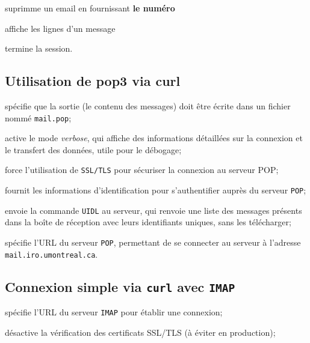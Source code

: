 \documentclass[a4paper]{report}
\begin{document}
     suprimme un email en fournissant 
    \textbf{le numéro}                                                      

     affiche les lignes d'un message

     termine la session.


\subsection{Utilisation de pop3 via curl}
    spécifie que la sortie (le contenu des messages) doit être écrite 
    dans un fichier nommé \texttt{mail.pop};  

    active le mode \textit{verbose}, qui affiche des informations détaillées 
    sur la connexion et le transfert des données, utile pour le débogage;  

    force l'utilisation de \texttt{SSL/TLS} pour sécuriser la connexion au 
    serveur POP;  

    fournit les informations d'identification  
    pour s'authentifier auprès du serveur \texttt{POP};  

    envoie la commande \texttt{UIDL} au serveur, 
    qui renvoie une liste des messages présents dans la boîte de réception 
    avec leurs identifiants uniques, sans les télécharger;  

    spécifie l'URL du serveur \texttt{POP}, permettant de 
    se connecter au serveur à l'adresse \texttt{mail.iro.umontreal.ca}.  

\subsection{Connexion simple via \texttt{curl} avec \texttt{IMAP}}
    spécifie l'URL du serveur \texttt{IMAP} pour établir une connexion;

    désactive la vérification des certificats SSL/TLS (à éviter en production);
\end{document}
